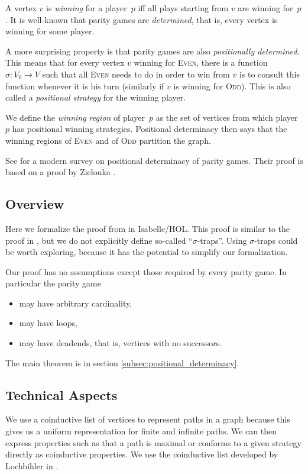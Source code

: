 \documentclass[11pt,a4paper]{scrartcl}
\newcommand{\Even}{\textsc{Even}\xspace}
\newcommand{\Odd}{\textsc{Odd}\xspace}
\begin{document}
A vertex $v$ is \emph{winning} for a player~$p$ iff all plays starting
from $v$ are winning for~$p$.  It is well-known that parity games are
\emph{determined}, that is, every vertex is winning for some player.

A more surprising property is that parity games are also
\emph{positionally determined}.  This means that for every vertex $v$
winning for \Even, there is a function $\sigma: V_0 \to V$ such that
all \Even needs to do in order to win from $v$ is to consult this
function whenever it is his turn (similarly if $v$ is winning for
\Odd).  This is also called a \emph{positional strategy} for the
winning player.

We define the \emph{winning region} of player~$p$ as the set of
vertices from which player~$p$ has positional winning strategies.
Positional determinacy then says that the winning regions of \Even and
of \Odd partition the graph.

See \cite{automata2002/kuesters} for a modern survey on positional
determinacy of parity games.  Their proof is based on a proof by
Zielonka \cite{zielonka1998}.

\subsection{Overview}

Here we formalize the proof from \cite{kreutzer2015} in Isabelle/HOL.
This proof is similar to the proof in \cite{automata2002/kuesters},
but we do not explicitly define so-called ``$\sigma$-traps''.  Using
$\sigma$-traps could be worth exploring, because it has the potential
to simplify our formalization.

Our proof has no assumptions except those required by every parity
game.  In particular the parity game
\begin{itemize}
\item may have arbitrary cardinality,
\item may have loops,
\item may have deadends, that is, vertices with no successors.
\end{itemize}

The main theorem is in section \ref{subsec:positional_determinacy}.

\subsection{Technical Aspects}

We use a coinductive list of vertices to represent paths in a graph
because this gives us a uniform representation for finite and infinite
paths.  We can then express properties such as that a path is maximal
or conforms to a given strategy directly as coinductive properties.
We use the coinductive list developed by Lochbihler in
\cite{Coinductive-AFP}.
\end{document}
